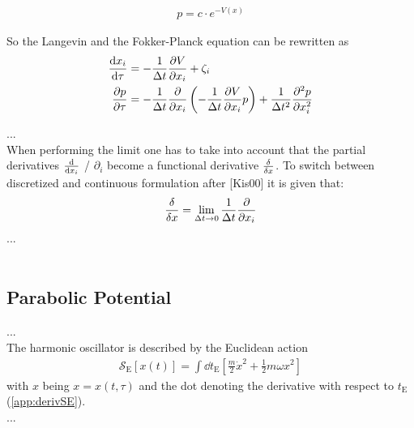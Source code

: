 \documentclass[11pt,a4paper]{scrartcl}
\newcommand{\action}{\ensuremath{\mathcal{S}}}
\newcommand{\OverDeltaT}[1]{\ensuremath{\frac{#1}{\Delta t}}}
\begin{document}
\begin{align}
    p = c \cdot e^{-V(x)}
\end{align}{}

\noindent So the Langevin and the Fokker-Planck equation can be rewritten as
\begin{align}
    \dv{x_i}{\tau} &= - \frac{1}{\Delta t} \pdv{V}{x_i} + \zeta_i\\
    \pdv{p}{\tau} &= - \frac{1}{\Delta t} \pdv{x_i} \left( - \frac{1}{\Delta t} \pdv{V}{x_i} p \right) + \frac{1}{\Delta t^2} \pdv[2]{p}{x_i}
\end{align}{}

...\\
When performing the limit one has to take into account that the partial derivatives $\dv{x_i}$ / $\partial_i$  become a functional derivative $\fdv{x}$. To switch between discretized and continuous formulation after [Kis00] it is given that:
\begin{equation}
    \fdv{x} = \lim\limits_{\Delta t \to 0} \OverDeltaT{1} \pdv{x_i}
\end{equation}
...\\
\\
\subsection{Parabolic Potential}

...\\
The harmonic oscillator is described by the Euclidean action
\begin{align}
    \action_\mathrm{E}\left[x(t)\right] = \int\dd{t_\mathrm{E}}\left[\frac{m}{2}\dot{x}^2 + \frac{1}{2} m \omega x^2\right]
\end{align}
with $x$ being $x = x(t, \tau )$ and the dot denoting the derivative with respect to $t_\mathrm{E}$ (\ref{app:derivSE}).\\
...
\end{document}
